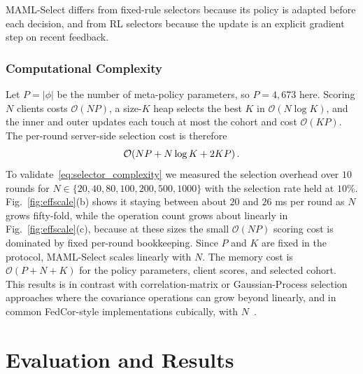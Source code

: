 \documentclass[journal]{IEEEtran}
\theoremstyle{remark}
\newcommand{\revision}[1]{#1}
\begin{document}
\revision{MAML-Select differs from fixed-rule selectors because its policy is adapted before each decision, and from RL selectors because the update is an explicit gradient step on recent feedback.}

\subsubsection{Computational Complexity}
\revision{Let $P=|\phi|$ be the number of meta-policy parameters, so $P=4{,}673$ here. Scoring $N$ clients costs $\mathcal{O}(NP)$, a size-$K$ heap selects the best $K$ in $\mathcal{O}(N\log K)$, and the inner and outer updates each touch at most the cohort and cost $\mathcal{O}(KP)$. The per-round server-side selection cost is therefore}
\begin{equation}
	\color{black}
	\mathcal{O}\!\left(NP + N\log K + 2KP\right).
	\label{eq:selector_complexity}
\end{equation}
\revision{To validate~\eqref{eq:selector_complexity} we measured the selection overhead over $10$ rounds for $N\in\{20,40,80,100,200,500,1000\}$ with the selection rate held at $10\%$. Fig.~\ref{fig:effscale}(b) shows it staying between about $20$ and $26$ ms per round as $N$ grows fifty-fold, while the operation count grows about linearly in Fig.~\ref{fig:effscale}(c), because at these sizes the small $\mathcal{O}(NP)$ scoring cost is dominated by fixed per-round bookkeeping. Since $P$ and $K$ are fixed in the protocol, MAML-Select scales linearly with $N$. The memory cost is $\mathcal{O}(P+N+K)$ for the policy parameters, client scores, and selected cohort. This results is in contrast with correlation-matrix or Gaussian-Process selection approaches where the covariance operations can grow beyond linearly, and in common FedCor-style implementations cubically, with $N$~\cite{tang2022fedcor}.}

\section{Evaluation and Results}
\end{document}
